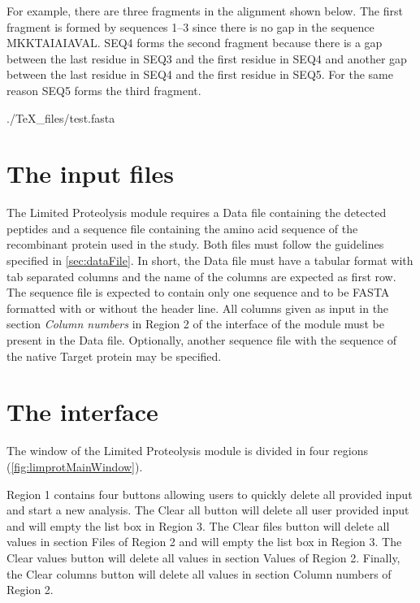 For example, there are three fragments in the alignment shown below. The first fragment is formed by sequences \numrange{1}{3} since there is no gap in the sequence MKKTAIAIAVAL. SEQ\num{4} forms the second fragment because there is a gap between the last residue in SEQ\num{3} and the first residue in SEQ\num{4} and another gap between the last residue in SEQ\num{4} and the first residue in SEQ\num{5}. For the same reason SEQ\num{5} forms the third fragment.

\begin{texshade}{./TeX_files/test.fasta}
	\hideconsensus
\end{texshade}

\section{The input files}

The Limited Proteolysis module requires a Data file containing the detected peptides and a sequence file containing the amino acid sequence of the recombinant protein used in the study. Both files must follow the guidelines specified in \autoref{sec:dataFile}. In short, the Data file must have a tabular format with tab separated columns and the name of the columns are expected as first row. The sequence file is expected to contain only one sequence and to be FASTA formatted with or without the header line. All columns given as input in the section \textit{Column numbers} in Region \num{2} of the interface of the module must be present in the Data file. Optionally, another sequence file with the sequence of the native Target protein may be specified.

\section{The interface}

The window of the Limited Proteolysis module is divided in four regions (\autoref{fig:limprotMainWindow}). 

Region \num{1} contains four buttons allowing users to quickly delete all provided input and start a new analysis. The Clear all button will delete all user provided input and will empty the list box in Region \num{3}. The Clear files button will delete all values in section Files of Region \num{2} and will empty the list box in Region \num{3}. The Clear values button will delete all values in section Values of Region \num{2}. Finally, the Clear columns button will delete all values in section Column numbers of Region \num{2}. 

